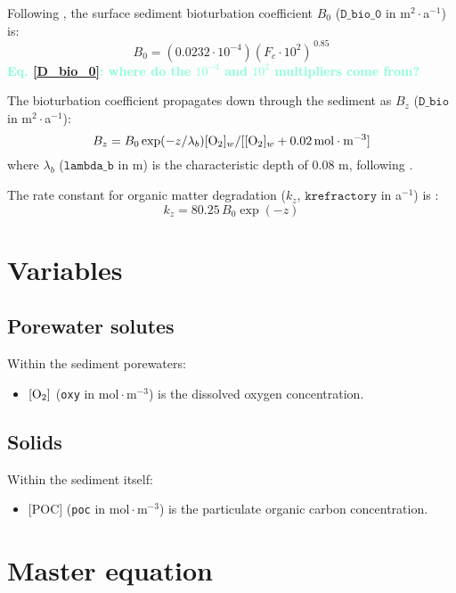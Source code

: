 \documentclass[a4paper]{article}
\newcommand{\code}[1]{\texttt{#1}}
\newcommand{\molmmm}{\mathrm{mol}\cdot\mathrm{m}^{-3}}
\newcommand{\wtf}[1]{\textcolor{Aquamarine}{\textbf{#1}}}
\begin{document}
Following \citet{archer_model_2002}, the surface sediment bioturbation coefficient $B_0$ ($\code{D\_bio\_0}$ in m$^2\cdot$a$^{-1}$) is:
\begin{equation}\label{D_bio_0}
B_0 = (0.0232 \cdot 10^{-4}) (F_c \cdot 10^2)^{\,0.85}
\end{equation}
\wtf{Eq. \eqref{D_bio_0}: where do the $10^{-4}$ and $10^2$ multipliers come from?}

The bioturbation coefficient propagates down through the sediment as $B_z$ ($\code{D\_bio}$ in m$^2\cdot$a$^{-1}$):
\begin{equation}
B_z = B_0 \exp(-z/\lambda_b) [\ce{O2}]_w / [[\ce{O2}]_w + 0.02 \, \molmmm]
\end{equation}
where $\lambda_b$ ($\code{lambda\_b}$ in m) is the characteristic depth of 0.08 m, following \citet{sayles_benthic_2001}.

The rate constant for organic matter degradation ($k_z$, $\code{krefractory}$ in a$^{-1}$) is \citep{archer_model_2002}:
\begin{equation}\label{k_poc_degradation}
k_z = 80.25 \, B_0 \exp(-z)
\end{equation}

\section{Variables}

\subsection{Porewater solutes}

Within the sediment porewaters:
\begin{itemize}
  \item $[\ce{O2}]$ (\code{oxy} in $\molmmm$) is the dissolved oxygen concentration.
\end{itemize}

\subsection{Solids}

Within the sediment itself:
\begin{itemize}
  \item $[$POC$]$ (\code{poc} in $\molmmm$) is the particulate organic carbon concentration.
\end{itemize}

\section{Master equation}
\end{document}
